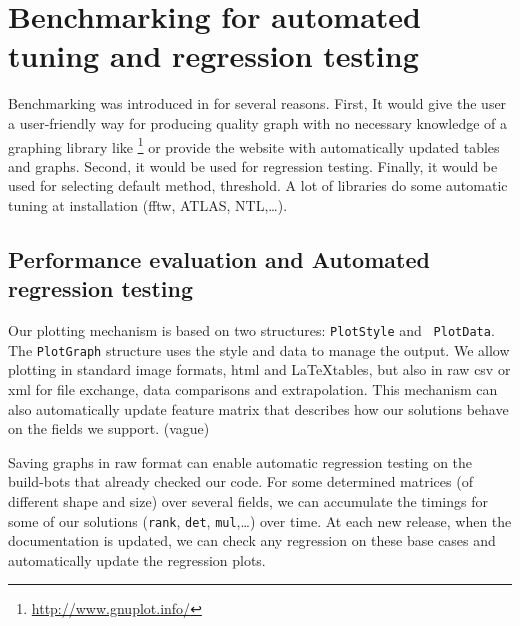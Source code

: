 \section{Benchmarking  for automated tuning and regression testing}\label{sec:bench}
%
Benchmarking was introduced in \linbox for several reasons. First, It would
give the user a user-friendly way for producing quality graph with no necessary
knowledge of a graphing library like \gnuplot%
%
%
\footnote{\url{http://www.gnuplot.info/}}
%
or provide the \linbox website with automatically updated tables and graphs.
Second, it would be used for regression testing.  Finally, it would be used for
selecting default method, threshold. A lot of libraries do some automatic tuning
at installation (\textsf{fftw}, \textsf{ATLAS}, \textsf{NTL},\ldots).
%
\par
%
%
%
\subsection{Performance evaluation and Automated regression testing}
%
Our plotting mechanism is based on two structures: {\tt PlotStyle} and {\tt
PlotData}. The  {\tt PlotGraph} structure uses the style and data to manage the
output.  We allow plotting in standard image formats, html and \LaTeX tables,
but also in raw csv or xml for file exchange, data comparisons and
extrapolation. This mechanism can also automatically update \linbox feature
matrix that describes how our solutions behave on the fields we support. (vague)
%
\par
%
% 
%
%
%
Saving graphs in raw format can enable automatic regression testing on the
build-bots that already checked our code. For some determined matrices (of
different shape and size) over several fields, we can accumulate the timings
for some of our solutions ({\tt rank}, {\tt det}, {\tt mul},\ldots) over time.
At each new release, when the documentation is updated, we can check any
regression on these base cases and automatically update the regression plots.
%
